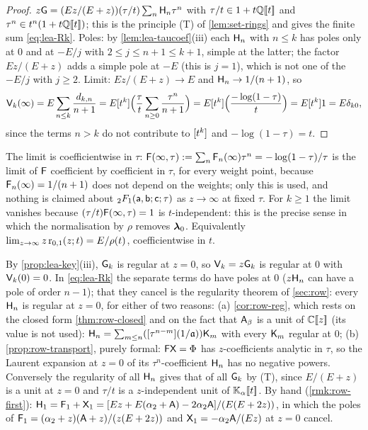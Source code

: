 \begin{proof}
$z\mathsf{G} = (Ez/(E+z))(\tau/t)\sum_n\mathsf{H}_n\tau^n$ with $\tau/t\in 1 + t\mathbb{Q}[\![ t ]\!]$ and $\tau^n\in t^n(1 + t\mathbb{Q}[\![ t ]\!])$; this is the principle (T) of \cref{lem:set-rings} and gives the finite sum \eqref{eq:lea-Rk}. Poles: by \cref{lem:lea-taucoef}(iii) each $\mathsf{H}_n$ with $n\leq k$ has poles only at $0$ and at $-E/j$ with $2\leq j\leq n+1\leq k+1$, simple at the latter; the factor $Ez/(E+z)$ adds a simple pole at $-E$ (this is $j = 1$), which is not one of the $-E/j$ with $j\geq 2$. Limit: $Ez/(E+z)\to E$ and $\mathsf{H}_n\to 1/(n+1)$, so
\[
\mathsf{V}_k(\infty) = E\sum_{n\leq k}\frac{d_{k,n}}{n+1} = E[t^k]\Bigl(\frac{\tau}{t}\sum_{n\geq 0}\frac{\tau^n}{n+1}\Bigr) = E[t^k]\Bigl(\frac{-\log(1-\tau)}{t}\Bigr) = E[t^k]1 = E\delta_{k0},
\]
since the terms $n > k$ do not contribute to $[t^k]$ and $-\log(1-\tau) = t$.
\end{proof}

The limit is coefficientwise in $\tau$: $\mathsf{F}(\infty,\tau) := \sum_n\mathsf{F}_n(\infty)\tau^n = -\log(1-\tau)/\tau$ is the limit of $\mathsf{F}$ coefficient by coefficient in $\tau$, for every weight point, because $\mathsf{F}_n(\infty) = 1/(n+1)$ does not depend on the weights; only this is used, and nothing is claimed about ${}_2F_1(\mathsf{a},\mathsf{b};\mathsf{c};\tau)$ as $z\to\infty$ at fixed $\tau$. For $k\geq 1$ the limit vanishes because $(\tau/t)\mathsf{F}(\infty,\tau) = 1$ is $t$-independent: this is the precise sense in which the normalisation by $\rho$ removes $\boldsymbol{\lambda}_0$. Equivalently $\lim_{z\to\infty}z\,\mathrm{r}_{0,1}(z;t) = E/\rho(t)$, coefficientwise in $t$.

\begin{rmk}[no pole at $z = 0$]
\label{rmk:lea-nopole}
By \cref{prop:lea-key}(iii), $\mathsf{G}_k$ is regular at $z = 0$, so $\mathsf{V}_k = z\mathsf{G}_k$ is regular at $0$ with $\mathsf{V}_k(0) = 0$. In \eqref{eq:lea-Rk} the separate terms do have poles at $0$ ($z\mathsf{H}_n$ can have a pole of order $n-1$); that they cancel is the regularity theorem of \cref{sec:row}: every $\mathsf{H}_n$ is regular at $z = 0$, for either of two reasons: (a) \cref{cor:row-reg}, which rests on the closed form \cref{thm:row-closed} and on the fact that $\mathsf{A}_{\beta}$ is a unit of $\mathbb{C}[\![ z ]\!]$ (its value is not used): $\mathsf{H}_n = \sum_{m\leq n}([\tau^{n-m}](1/\mathfrak{a}))\mathsf{K}_m$ with every $\mathsf{K}_m$ regular at $0$; (b) \cref{prop:row-transport}, purely formal: $\mathsf{F}\mathsf{X} = \Phi$ has $z$-coefficients analytic in $\tau$, so the Laurent expansion at $z = 0$ of its $\tau^n$-coefficient $\mathsf{H}_n$ has no negative powers. Conversely the regularity of all $\mathsf{H}_n$ gives that of all $\mathsf{G}_k$ by (T), since $E/(E+z)$ is a unit at $z = 0$ and $\tau/t$ is a $z$-independent unit of $\mathbb{K}_{\alpha}[\![ t ]\!]$. By hand (\cref{rmk:row-first}): $\mathsf{H}_1 = \mathsf{F}_1 + \mathsf{X}_1 = [Ez + E(\alpha_2+\mathsf{A}) - 2\alpha_2\mathsf{A}]/(E(E+2z))$, in which the poles of $\mathsf{F}_1 = (\alpha_2+z)(\mathsf{A}+z)/(z(E+2z))$ and $\mathsf{X}_1 = -\alpha_2\mathsf{A}/(Ez)$ at $z = 0$ cancel.
\end{rmk}

